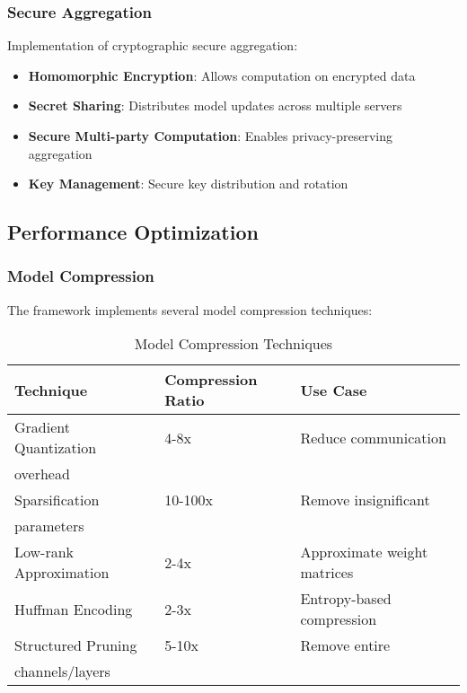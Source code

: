 \subsubsection{Secure Aggregation}

Implementation of cryptographic secure aggregation:

\begin{itemize}
    \item \textbf{Homomorphic Encryption}: Allows computation on encrypted data
    \item \textbf{Secret Sharing}: Distributes model updates across multiple servers
    \item \textbf{Secure Multi-party Computation}: Enables privacy-preserving aggregation
    \item \textbf{Key Management}: Secure key distribution and rotation
\end{itemize}

\subsection{Performance Optimization}

\subsubsection{Model Compression}

The framework implements several model compression techniques:

\begin{table}[H]
\centering
\caption{Model Compression Techniques}
\label{tab:compression-techniques}
\begin{tabular}{@{}llp{5cm}@{}}
\toprule
\textbf{Technique} & \textbf{Compression Ratio} & \textbf{Use Case} \\
\midrule
Gradient Quantization & 4-8x & Reduce communication\\overhead \\
Sparsification & 10-100x & Remove insignificant\\parameters \\
Low-rank Approximation & 2-4x & Approximate weight matrices \\
Huffman Encoding & 2-3x & Entropy-based compression \\
Structured Pruning & 5-10x & Remove entire\\channels/layers \\
\bottomrule
\end{tabular}
\end{table}

